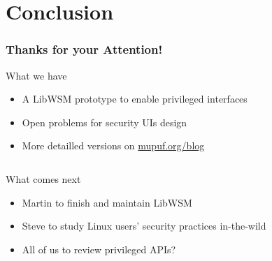 \section{Conclusion}
\begin{frame}
\frametitle{Thanks for your Attention!}

  \begin{block}{What we have}
  \begin{itemize}
  \item A LibWSM prototype to enable privileged interfaces
  \item Open problems for security UIs design
  \item More detailled versions on \url{mupuf.org/blog}
  \end{itemize}
  \end{block}

  \begin{columns}[T]
    \begin{column}{0.6\paperwidth}
	  \begin{block}{What comes next}
		\begin{itemize}
		\item Martin to finish and maintain LibWSM
		\item Steve to study Linux users' security practices in-the-wild
		\item All of us to review privileged APIs?
		\end{itemize}
	  \end{block}
    \end{column}
  \end{columns}

\end{frame}

